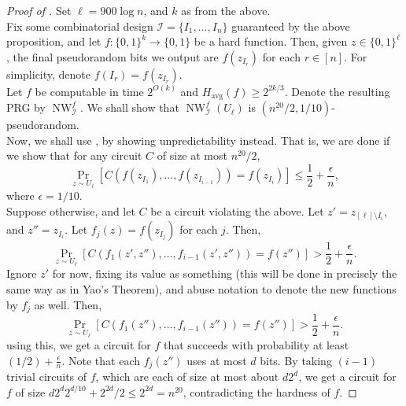 \documentclass{article}
\newcommand{\avg}{\text{avg}}
\newcommand{\NW}{\operatorname{NW}}
\begin{document}
		\begin{proof}[Proof of ]
			Set $\ell = 900 \log n$, and $k$ as from the above.\\
			Fix some combinatorial design $\mathcal{I} = \{I_1,\ldots,I_n\}$ guaranteed by the above proposition, and let $f : \{0,1\}^k \to \{0,1\}$ be a hard function. Then, given $z \in \{0,1\}^\ell$, the final pseudorandom bits we output are $f(z_{I_r})$ for each $r \in [n]$. For simplicity, denote $f(I_r) = f(z_{I_r})$. \\
			Let $f$ be computable in time $2^{O(k)}$ and $H_\avg(f) \ge 2^{2k/3}$. Denote the resulting PRG by $\NW_{\mathcal{I}}^f$. We shall show that $\NW_{\mathcal{I}}^f(U_\ell)$ is $(n^{20}/2, 1/10)$-pseudorandom. \\
			Now, we shall use , by showing unpredictability instead. That is, we are done if we show that for any circuit $C$ of size at most $n^{20}/2$,
			\[ \Pr_{z \sim U_\ell}\left[ C(f(z_{I_1}),\ldots,f(z_{I_{i-1}})) = f(z_{I_i}) \right] \le \frac{1}{2} + \frac{\epsilon}{n}, \]
			where $\epsilon = 1/10$.\\
			Suppose otherwise, and let $C$ be a circuit violating the above. Let $z' = z_{[\ell] \setminus I_i}$, and $z'' = z_{I_i}$.
			Let $f_j(z) = f(z_{I_j})$ for each $j$. Then,
			\[ \Pr_{z \sim U_\ell}\left[ C(f_1(z',z''),\ldots,f_{i-1}(z',z'')) = f(z'') \right] > \frac{1}{2} + \frac{\epsilon}{n}. \]
			Ignore $z'$ for now, fixing its value as something (this will be done in precisely the same way as in Yao's Theorem), and abuse notation to denote the new functions by $f_j$ as well. Then,
			\[ \Pr_{z \sim U_\ell}\left[ C(f_1(z''),\ldots,f_{i-1}(z'')) = f(z'') \right] > \frac{1}{2} + \frac{\epsilon}{n}. \]
			using this, we get a circuit for $f$ that succeeds with probability at least $(1/2)+\frac{\epsilon}{n}$. Note that each $f_{j}(z'')$ uses at most $d$ bits. By taking $(i-1)$ trivial circuits of $f$, which are each of size at most about $d 2^d$, we get a circuit for $f$ of size $d 2^d 2^{d/10} + 2^{2d}/2 \le 2^{2d} = n^{20}$, contradicting the hardness of $f$.
		\end{proof}
\end{document}
